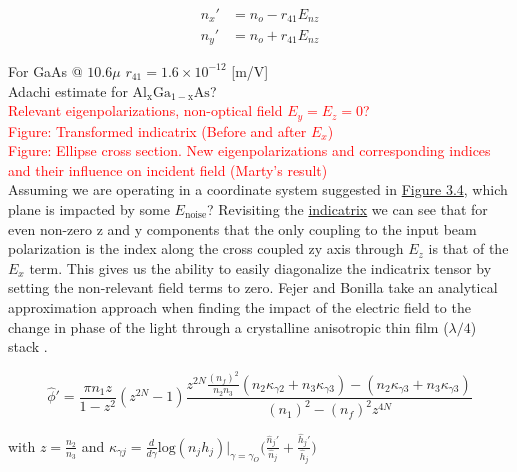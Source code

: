 \begin{equation}
\begin{aligned}
n_x' & = n_o - r_{41}E_{nz} \\
n_y' & = n_o + r_{41}E_{nz}
\end{aligned}
\end{equation}

For GaAs @ $10.6\mu$ $r_{41} = 1.6 \times 10^{-12}$ [m/V]
\\
Adachi estimate for $\mathrm{Al_{x}Ga_{1-x}As}$?
\\
\textcolor{red}{Relevant eigenpolarizations, non-optical field $E_y = E_z = 0$?}
\\
\textcolor{red}{Figure: Transformed indicatrix (Before and after $E_x$)}
\\
\textcolor{red}{Figure: Ellipse cross section. New eigenpolarizations and corresponding indices and their influence on incident field (Marty's result)}
\\
Assuming we are operating in a coordinate system suggested in \hyperref[fig:algaas_coords]{Figure 3.4}, which plane is impacted by some $E_\mathrm{noise}$? Revisiting the \hyperref[eq:zindicatrix]{indicatrix} we can see that for even non-zero z and y components that the only coupling to the input beam polarization is the index along the cross coupled zy axis through $E_z$ is that of the $E_x$ term. This gives us the ability to easily diagonalize the indicatrix tensor by setting the non-relevant field terms to zero.
Fejer and Bonilla take an analytical approximation approach when finding the impact of the electric field to the change in phase of the light through a crystalline anisotropic thin film ($\lambda/4$) stack \cite{bonilla_fejer}.

\begin{equation}
\hat{\phi}' = \frac{\pi n_1 z}{1-z^2}(z^{2N} -1) \frac{z^{2N} \frac{(n_f)^2}{n_2 n_3}(n_2 \kappa_{\gamma 2} + n_3\kappa_{\gamma 3}) - (n_2 \kappa_{\gamma 3} + n_3\kappa_{\gamma 3})}{(n_1)^2 -(n_f)^2 z^{4N}}
\end{equation}

with $z = \frac{n_2}{n_3}$
and
$
\kappa_{\gamma j} = \frac{d}{d \gamma} \mathrm{log}(n_j h_j)|_{\gamma =\gamma_{O}} \bigg(\frac{\hat{n}_j'}{\hat{n}_j} +\frac{\hat{h}_j'}{\hat{h}_j} \bigg)
$

